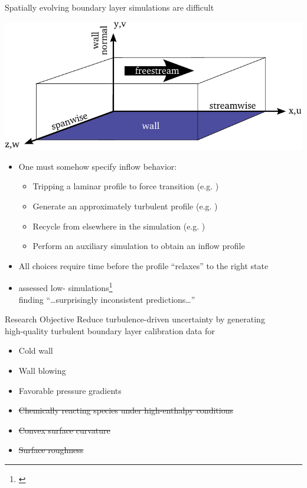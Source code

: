 \documentclass[mathserif]{beamer}
\begin{document}
\begin{frame}{Spatially evolving boundary layer simulations are difficult}
\begin{center}
    \includegraphics[width=.50\linewidth]{FlatPlateSchematic}
\end{center}
\vspace{-0.5em}
\begin{itemize}
  \item One must somehow specify inflow behavior:
    \begin{itemize}
      \item Tripping a laminar profile to force transition
            (e.g. \citet{Wu1999Simulation})
      \item Generate an approximately turbulent profile
            (e.g. \citet{Lund1998Generation})
      \item Recycle from elsewhere in the simulation
            (e.g. \citet{Simens2009Highresolution})
      \item Perform an auxiliary simulation to obtain an inflow profile
    \end{itemize}
  \item All choices require time before the profile ``relaxes'' to the right state
  \item \citet{Schlatter2010Assessment} assessed low-\Reynolds{}
        simulations\footnote{%
            \tiny
            \citet{Spalart1988Direct, Komminaho2002Reynolds, Khujadze2007New,
            Khujadze2004DNS, Ferrante2005Reynolds, Simens2009Highresolution,
            Wu2009Direct, Schlatter2009High, Schlatter2009Turbulent}
        }\\ finding ``\dots{}surprisingly inconsistent predictions\dots{}''
\end{itemize}
\end{frame}

\begin{frame}{Research Objective}
    Reduce turbulence-driven uncertainty by generating\\
    high-quality turbulent boundary layer calibration data for
    \begin{itemize}
        \item Cold wall
        \item Wall blowing
        \item Favorable pressure gradients
        \item<2-> \sout{Chemically reacting species under high-enthalpy conditions}
        \item<2-> \sout{Convex surface curvature}
        \item<2-> \sout{Surface roughness}
    \end{itemize}
\end{frame}
\end{document}
